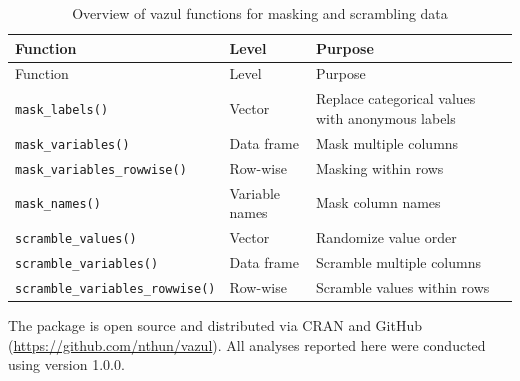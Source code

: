 \begin{longtable}[]{@{}
  >{\raggedright\arraybackslash}p{}
  >{\raggedright\arraybackslash}p{}
  >{\raggedright\arraybackslash}p{}@{}}
\caption{Overview of vazul functions for masking and scrambling data}\tabularnewline
\toprule\noalign{}
\begin{minipage}[b]{\linewidth}\raggedright
Function
\end{minipage} & \begin{minipage}[b]{\linewidth}\raggedright
Level
\end{minipage} & \begin{minipage}[b]{\linewidth}\raggedright
Purpose
\end{minipage} \\
\midrule\noalign{}
\endfirsthead
\toprule\noalign{}
\begin{minipage}[b]{\linewidth}\raggedright
Function
\end{minipage} & \begin{minipage}[b]{\linewidth}\raggedright
Level
\end{minipage} & \begin{minipage}[b]{\linewidth}\raggedright
Purpose
\end{minipage} \\
\midrule\noalign{}
\endhead
\bottomrule\noalign{}
\endlastfoot
\texttt{mask\_labels()} & Vector & Replace categorical values with anonymous labels \\
\texttt{mask\_variables()} & Data frame & Mask multiple columns \\
\texttt{mask\_variables\_rowwise()} & Row-wise & Masking within rows \\
\texttt{mask\_names()} & Variable names & Mask column names \\
\texttt{scramble\_values()} & Vector & Randomize value order \\
\texttt{scramble\_variables()} & Data frame & Scramble multiple columns \\
\texttt{scramble\_variables\_rowwise()} & Row-wise & Scramble values within rows \\
\end{longtable}

The  package is open source and distributed via CRAN and GitHub (\url{https://github.com/nthun/vazul}). All analyses reported here were conducted using version 1.0.0.

